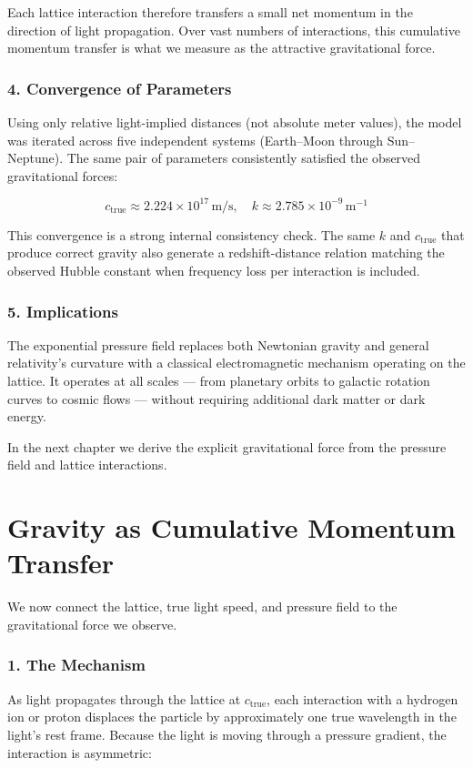 \documentclass[11pt,a4paper]{book}
\begin{document}
Each lattice interaction therefore transfers a small net momentum in the direction of light propagation. Over vast numbers of interactions, this cumulative momentum transfer is what we measure as the attractive gravitational force.

\subsection{4. Convergence of Parameters}
Using only relative light-implied distances (not absolute meter values), the model was iterated across five independent systems (Earth–Moon through Sun–Neptune). The same pair of parameters consistently satisfied the observed gravitational forces:

\[
c_{\text{true}} \approx 2.224 \times 10^{17} \, \text{m/s}, \quad k \approx 2.785 \times 10^{-9} \, \text{m}^{-1}
\]

This convergence is a strong internal consistency check. The same \( k \) and \( c_{\text{true}} \) that produce correct gravity also generate a redshift-distance relation matching the observed Hubble constant when frequency loss per interaction is included.

\subsection{5. Implications}
The exponential pressure field replaces both Newtonian gravity and general relativity’s curvature with a classical electromagnetic mechanism operating on the lattice. It operates at all scales — from planetary orbits to galactic rotation curves to cosmic flows — without requiring additional dark matter or dark energy.

In the next chapter we derive the explicit gravitational force from the pressure field and lattice interactions.

\chapter{Gravity as Cumulative Momentum Transfer}

We now connect the lattice, true light speed, and pressure field to the gravitational force we observe.

\subsection{1. The Mechanism}
As light propagates through the lattice at \( c_{\text{true}} \), each interaction with a hydrogen ion or proton displaces the particle by approximately one true wavelength in the light’s rest frame. Because the light is moving through a pressure gradient, the interaction is asymmetric:
\end{document}
